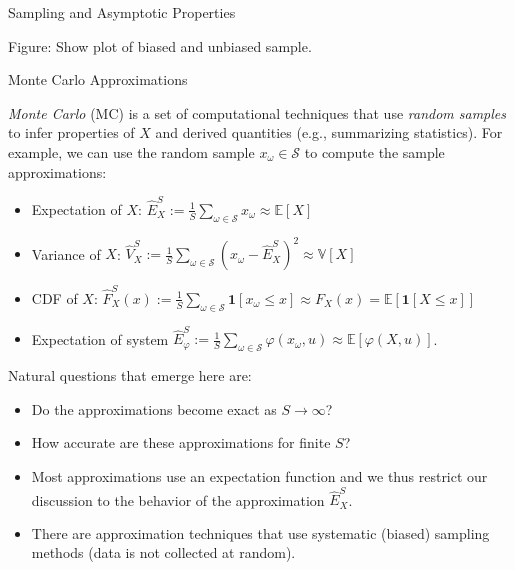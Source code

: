 \documentclass[9pt]{beamer}
\begin{document}
%
\begin{frame}{Sampling and Asymptotic Properties}

\begin{block}{}
{\color{red} Figure: Show plot of biased and unbiased sample.}
\end{block}

\end{frame}

%
\begin{frame}{Monte Carlo Approximations}

{\em Monte Carlo} (MC) is a set of computational techniques that use {\em random samples} to infer properties of $X$ and derived quantities (e.g., summarizing statistics).  For example, we can use the random sample $x_\omega \in \mathcal{S}$ to compute the sample approximations:
\begin{block}{}
\begin{itemize}
\item Expectation of $X$: $\hat{E}_X^S:=\frac{1}{S}\sum_{\omega \in \mathcal{S}}x_\omega\approx \mathbb{E}[X]$
\item Variance of $X$: $\hat{V}_X^S:=\frac{1}{S}\sum_{\omega \in \mathcal{S}}(x_\omega-\hat{E}_X^S)^2\approx \mathbb{V}[X]$
\item CDF of $X$: $\hat{F}_X^S(x):=\frac{1}{S}\sum_{\omega 
\in \mathcal{S}}\mathbf{1}[x_\omega \leq x]\approx F_X(x)=\mathbb{E}[{\mathbf{1}[X \leq x]}]$
\item Expectation of system $\hat{E}_\varphi^S:=\frac{1}{S}\sum_{\omega 
\in \mathcal{S}}\varphi(x_\omega,u)\approx \mathbb{E}[{\varphi(X,u)}]$. 
\end{itemize}
\end{block}
Natural questions that emerge here are: 
\begin{block}{}
\begin{itemize}
\item Do the approximations become exact as $S\to \infty$?
\item How accurate are these approximations for finite $S$?
\end{itemize}
\end{block}
\begin{itemize}
\item Most approximations use an expectation function and we thus restrict our discussion to the behavior of the approximation $\hat{E}_X^S$. 
\item There are approximation techniques that use systematic (biased) sampling methods (data is not collected at random). 
\end{itemize}
\end{frame}
\end{document}
